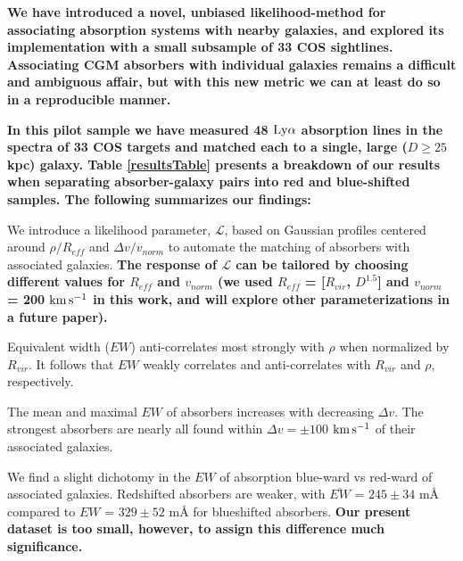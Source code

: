 \documentclass[twocolumn,tighten]{aastex6}
\begin{document}
\textbf{We have introduced a novel, unbiased likelihood-method for associating absorption systems with nearby galaxies, and explored its implementation with a small subsample of 33 COS sightlines. Associating CGM absorbers with individual galaxies remains a difficult and ambiguous affair, but with this new metric we can at least do so in a reproducible manner. }

\textbf{In this pilot sample we have measured 48 $\rm Ly\alpha$ absorption lines in the spectra of 33 COS targets and matched each to a single, large ($D\geq 25$ kpc) galaxy. Table \ref{resultsTable} presents a breakdown of our results when separating absorber-galaxy pairs into red and blue-shifted samples. The following summarizes our findings:}

\vspace{10pt}

\indent \textbullet \indent We introduce a likelihood parameter, $\mathcal{L}$, based on Gaussian profiles centered around $\rho / R_{eff}$ and $\Delta v / v_{norm}$ to automate the matching of absorbers with associated galaxies. \textbf{The response of $\mathcal{L}$ can be tailored by choosing different values for $R_{eff}$ and $v_{norm}$ (we used $R_{eff}$ = [$R_{vir}$, $D^{1.5}$] and $v_{norm}$ = 200 $\rm km\, s^{-1}$ in this work, and will explore other parameterizations in a future paper).}

\vspace{10pt}

\indent \textbullet \indent Equivalent width ($EW$) anti-correlates most strongly with $\rho$ when normalized by $R_{vir}$. It follows that $EW$ weakly correlates and anti-correlates with $R_{vir}$ and $\rho$, respectively.

\vspace{10pt}

\indent \textbullet \indent The mean and maximal $EW$ of absorbers increases with decreasing $\Delta v$. The strongest absorbers are nearly all found within $\Delta v = \pm 100$ $\rm km\, s^{-1}$ of their associated galaxies.

\vspace{10pt}

\indent \textbullet \indent We find a slight dichotomy in the $EW$ of absorption blue-ward vs red-ward of associated galaxies. Redshifted absorbers are weaker, with $\overline{EW}$ = $245 \pm 34$ $\textrm{m\AA}$ compared to $EW$ = $329 \pm 52$ $\textrm{m\AA}$ for blueshifted absorbers. \textbf{Our present dataset is too small, however, to assign this difference much significance.}
\end{document}
